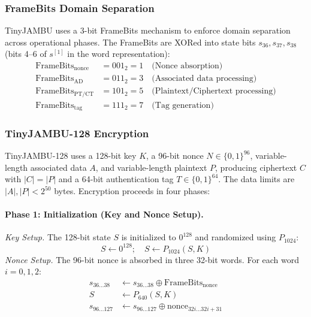 \documentclass[11pt,a4paper]{article}
\newcommand{\xor}{\oplus}
\begin{document}
\subsubsection{FrameBits Domain Separation}

TinyJAMBU uses a 3-bit FrameBits mechanism to enforce domain separation across operational phases. The FrameBits are XORed into state bits $s_{36}, s_{37}, s_{38}$ (bits 4--6 of $s^{[1]}$ in the word representation):
\begin{align}
\text{FrameBits}_{\text{nonce}} &= 001_2 = 1 \quad \text{(Nonce absorption)} \nonumber\\
\text{FrameBits}_{\text{AD}}    &= 011_2 = 3 \quad \text{(Associated data processing)} \nonumber\\
\text{FrameBits}_{\text{PT/CT}} &= 101_2 = 5 \quad \text{(Plaintext/Ciphertext processing)} \nonumber\\
\text{FrameBits}_{\text{tag}}   &= 111_2 = 7 \quad \text{(Tag generation)}
\label{eq:tj_framebits}
\end{align}

\subsubsection{TinyJAMBU-128 Encryption}

TinyJAMBU-128 uses a 128-bit key $K$, a 96-bit nonce $N \in \{0,1\}^{96}$, variable-length associated data $A$, and variable-length plaintext $P$, producing ciphertext $C$ with $|C| = |P|$ and a 64-bit authentication tag $T \in \{0,1\}^{64}$. The data limits are $|A|, |P| < 2^{50}$ bytes. Encryption proceeds in four phases:

\paragraph{Phase 1: Initialization (Key and Nonce Setup).}
\textit{Key Setup.} The 128-bit state $S$ is initialized to $0^{128}$ and randomized using $P_{1024}$:
\begin{equation}
S \leftarrow 0^{128}; \quad S \leftarrow P_{1024}(S, K)
\label{eq:tj_key_setup}
\end{equation}
\textit{Nonce Setup.} The 96-bit nonce is absorbed in three 32-bit words. For each word $i = 0, 1, 2$:
\begin{align}
s_{36\ldots 38} &\leftarrow s_{36\ldots 38} \xor \text{FrameBits}_{\text{nonce}} \nonumber\\
S &\leftarrow P_{640}(S, K) \nonumber\\
s_{96\ldots 127} &\leftarrow s_{96\ldots 127} \xor \text{nonce}_{32i\ldots 32i+31}
\label{eq:tj_nonce_setup}
\end{align}
\end{document}
